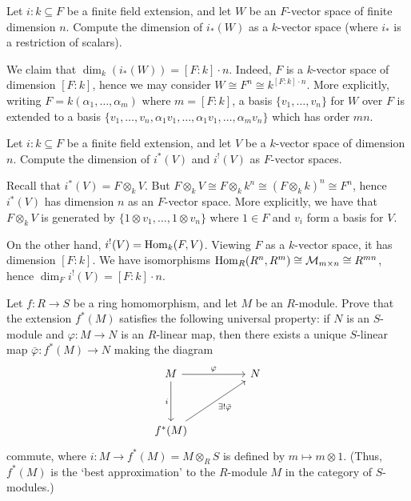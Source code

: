 \documentclass[../../master.tex]{subfiles}
\begin{document}
\begin{problem}
    Let $i : k \subseteq F$ be a finite field extension, and let $W$ be an $F$-vector space of finite dimension $n$.
    Compute the dimension of $i_{*}(W)$ as a $k$-vector space (where $i_{*}$ is a restriction of scalars).
\end{problem}

\begin{solution}
    We claim that $\dim_k(i_{*}(W)) = [F : k] \cdot n$.
    Indeed, $F$ is a $k$-vector space of dimension $[F : k]$, hence we may consider $W \cong F^{n} \cong k^{[F : k] \cdot n}$.
    More explicitly, writing $F = k(\alpha_1, \ldots, \alpha_m)$ where $m = [F : k]$, a basis $\{v_1, \ldots, v_n\}$ for $W$ over $F$ is extended to a basis $\{v_1, \ldots, v_n, \alpha_1 v_1, \ldots, \alpha_1 v_1, \ldots, \alpha_m v_n\}$ which has order $mn$.
\end{solution}

\begin{problem}
    Let $i : k \subseteq F$ be a finite field extension, and let $V$ be a $k$-vector space of dimension $n$.
    Compute the dimension of $i^{*}(V)$ and $i^{!}(V)$ as $F$-vector spaces.
\end{problem}

\begin{solution}
    Recall that $i^{*}(V) = F \otimes_{k} V$.
    But $F \otimes_k V \cong F \otimes_k k^{n} \cong (F \otimes_k k)^{n} \cong F^{n}$, hence $i^{*}(V)$ has dimension $n$ as an $F$-vector space.
    More explicitly, we have that $F \otimes_k V$ is generated by $\{1 \otimes v_1, \ldots, 1 \otimes v_n\}$ where $1 \in F$ and $v_i$ form a basis for $V$.

    On the other hand, $i^{!}(V) = \operatorname{Hom}_k(F, V)$.
    Viewing $F$ as a $k$-vector space, it has dimension $[F : k]$.
    We have isomorphisms $\operatorname{Hom}_R(R^{n}, R^{m}) \cong \mathcal{M}_{m \times n} \cong R^{mn}$, hence $\dim_F i^{!}(V) = [F : k] \cdot n$.
\end{solution}

\begin{problem}
    Let $f : R \to S$ be a ring homomorphism, and let $M$ be an $R$-module.
    Prove that the extension $f^{*}(M)$ satisfies the following universal property:
    if $N$ is an $S$-module and $\varphi : M \to N$ is an $R$-linear map, then there exists a unique $S$-linear map $\bar{\varphi} : f^{*}(M) \to N$ making the diagram
    \[
    \begin{tikzcd}
        M & & N \\
        \\
        f^{*}(M)
        \arrow[from=1-1, to=1-3, "\varphi"]
        \arrow[from=1-1, to=3-1, "i"'] 
        \arrow[from=3-1, to=1-3, "\exists! \bar{\varphi}"'] 
    \end{tikzcd}
    \]
    commute, where $i : M \to f^{*}(M) = M \otimes_R S$ is defined by $m \mapsto m \otimes 1$.
    (Thus, $f^{*}(M)$ is the `best approximation' to the $R$-module $M$ in the category of $S$-modules.)
\end{problem}
\end{document}
